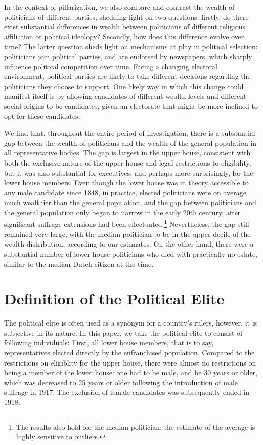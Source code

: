 In the context of pillarization, we also compare and contrast the wealth of politicians of different parties, shedding light on two questions: firstly, do there exist substantial differences in wealth between politicians of different religious affiliation or political ideology? Secondly, how does this difference evolve over time? The latter question sheds light on mechanisms at play in political selection: politicians join political parties, and are endorsed by newspapers, which sharply influence political competition over time. Facing a changing electoral environment, political parties are likely to take different decisions regarding the politicians they choose to support. One likely way in which this change could manifest itself is by allowing candidates of different wealth levels and different social origins to be candidates, given an electorate that might be more inclined to opt for these candidates. 

We find that, throughout the entire period of investigation, there is a substantial gap between the wealth of politicians and the wealth of the general population in all representative bodies. The gap is largest in the upper house, consistent with both the exclusive nature of the upper house and legal restrictions to eligibility, but it was also substantial for executives, and perhaps more surprisingly, for the lower house members. Even though the lower house was in theory accessible to any male candidate since 1848, in practice, elected politicians were on average much wealthier than the general population, and the gap between politicians and the general population only began to narrow in the early 20th century, after significant suffrage extensions had been effectuated.\footnote{The results also hold for the median politician: the estimate of the average is highly sensitive to outliers.} Nevertheless, the gap still remained very large, with the median politician to be in the upper decile of the wealth distribution, according to our estimates. On the other hand, there were a substantial number of lower house politicians who died with practically no estate, similar to the median Dutch citizen at the time.\autocite{de2020exploring}

\section{Definition of the Political Elite}
The political elite is often used as a synonym for a country's rulers, however, it is subjective in its nature. In this paper, we take the political elite to consist of following individuals: First, all lower house members, that is to say, representatives elected directly by the enfranchised population. Compared to the restrictions on eligiblity for the upper house, there were almost no restrictions on being a member of the lower house: one had to be male, and be 30 years or older, which was decreased to 25 years or older following the introduction of male suffrage in 1917. The exclusion of female candidates was subsequently ended in 1918. \autocite{van2018tussen} 

